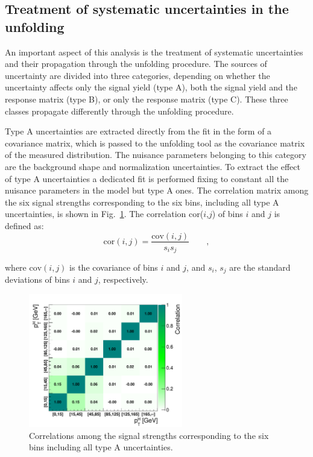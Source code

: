 \subsection{Treatment of systematic uncertainties in the unfolding}\label{sec:uncunf}

An important aspect of this analysis is the treatment of systematic
uncertainties and their propagation through the unfolding procedure.
The sources of uncertainty are divided into three categories, depending
on whether the uncertainty affects only the signal yield (type A), both the signal
yield and the response matrix (type B), or only the response matrix (type C).
These three classes propagate differently through the unfolding procedure.

Type A uncertainties are extracted directly from the fit in the form of a covariance
matrix, which is passed to the unfolding tool as the covariance
matrix of the measured distribution. The nuisance parameters belonging to this category
are the background shape and normalization uncertainties.
To extract the effect of type A uncertainties a dedicated fit is performed fixing to constant all the nuisance parameters in the model but type A ones.
The correlation matrix among the six signal strengths corresponding to the six \pth bins, including all type A uncertainties, is shown in Fig.~\ref{fig:typeA_corr}.
The correlation cor($i$,$j$) of bins $i$ and $j$ is defined as:	
\begin{equation}\label{eq:correlation}
\mathrm{cor}(i,j) = \frac{ \mathrm{cov}(i,j) }{  s_{i}s_{j} } \qquad ,
\end{equation} 

\noindent where $\mathrm{cov}(i,j)$ is the covariance of bins $i$ and $j$, and $s_{i}$, $s_{j}$ are the standard deviations of bins $i$ and $j$,  respectively.

\begin{figure}[htb]
\centering
\includegraphics[width=0.6\textwidth]{images/typeACovMatrix.pdf}
\caption{Correlations among the signal strengths corresponding to the six \pth bins including all type A uncertainties.}\label{fig:typeA_corr}
\end{figure}


